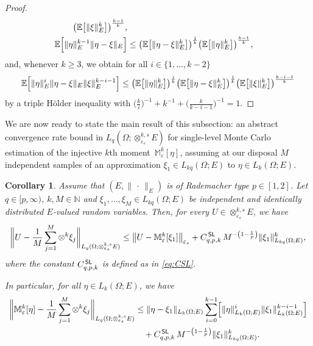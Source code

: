 \documentclass[reqno]{amsart}
\numberwithin{equation}{section}
\newcommand{\bbE}{\mathbb{E}}
\newcommand{\bbM}{\mathbb{M}}
\newcommand{\bbN}{\mathbb{N}}
\newcommand{\xk}{\otimes^k}
\newcommand{\xkseps}{\otimes^{k,s}_{\varepsilon_s}}
\newcommand{\tenvec}{U}
\newcommand{\Mk}{\bbM^k_\varepsilon}
\newcommand{\norm}[2]{     \| #1       \|_{ #2 }}
\newcommand{\eps}{\varepsilon}
\newcommand{\CSL}{C^{\,\sf SL}_{q,p,k}}
\newtheorem{corollary}[lemma]{Corollary}
\theoremstyle{remark}
\theoremstyle{definition}
\begin{document}
\begin{proof}
\begin{align*}
	\bigl( \bbE\bigl[ \norm{ \xi }{E}^k \bigr] \bigr)^{\frac{k-1}{k}}  , 
	\\ 
	\bbE\Bigl[ \norm{ \eta }{E}^{k-1} \norm{ \eta -\xi }{E} \Bigr] 
	&\leq 
	\bigl( \bbE\bigl[ \norm{ \eta -\xi }{E}^k \bigr] \bigr)^{\frac{1}{k}}  
	\bigl( \bbE\bigl[ \norm{ \eta }{E}^k \bigr] \bigr)^{\frac{k-1}{k}}  , 
	\end{align*} 
	and, whenever $k\geq 3$, 
	we obtain for all $i\in\{1,\ldots,k-2\}$ 
	\begin{align*} 
	\bbE\Bigl[ \norm{ \eta }{E}^i \norm{ \eta -\xi }{E} \norm{ \xi }{E}^{k-i-1} \Bigr] 
	\leq 		
	\bigl( \bbE\bigl[ \norm{ \eta }{E}^k \bigr] \bigr)^{\frac{i}{k}}  
	\bigl( \bbE\bigl[ \norm{ \eta -\xi }{E}^k \bigr] \bigr)^{\frac{1}{k}}  
	\bigl( \bbE\bigl[ \norm{ \xi }{E}^k \bigr] \bigr)^{\frac{k-i-1}{k}}  
	\end{align*} 
	by a triple H\"older inequality 
	with 
	$\bigl(\tfrac{k}{i}\bigr)^{-1} 
	+ 
	k^{-1}
	+ 
	\bigl(\tfrac{k}{k-i-1}\bigr)^{-1} 
	= 
	1$. 
\end{proof} 

We are now ready to state the main result of this subsection: 
an abstract convergence rate bound in $L_q(\Omega; \xkseps E)$ 
for single-level Monte Carlo 
estimation of the injective $k$th moment~$\Mk[\eta]$, 
assuming at our disposal $M$ independent  
samples of an approximation 
$\xi_1\in L_{kq}(\Omega;E)$ to $\eta\in L_k(\Omega;E)$. 

\begin{corollary}\label{cor:MC-k}
	Assume that  
	$(E,\norm{\,\cdot\,}{E})$ 
	is of Rademacher type $p\in[1,2]$. 
	Let $q\in[p,\infty)$, $k,M\in\bbN$ 
	and $\xi_1,\ldots,\xi_M\in L_{kq}(\Omega;E)$ be 
	independent and identically distributed 
	$E$-valued random variables. 
	Then, for every $\tenvec \in \xkseps E$, we have 
	\[
	\biggl\| 
	\tenvec 
	-
	\frac{1}{M} 
	\sum_{j=1}^M 
	\xk \xi_j 
	\biggr\|_{L_q(\Omega;\xkseps E)} 
	\leq 
	\bigl\| \tenvec - \Mk[\xi_1] \bigr\|_{\eps_s}
	+ 
	\CSL \,  
	M^{-\left( 1-\frac{1}{p} \right)} 
	\norm{ \xi_1 }{L_{kq}(\Omega; E)}^k 
	,
	\]
	where the constant $\CSL$ is defined as in \eqref{eq:CSL}. 
	
	In particular, 
	for all $\eta\in L_k(\Omega;E)$,
	we have   
	\begin{align*} 
	\biggl\| 
	\Mk[\eta]
	-
	\frac{1}{M} 
	\sum_{j=1}^M 
	\xk \xi_j 
	\biggr\|_{L_q(\Omega;\xkseps E)} 
	&\leq 
	\norm{ \eta - \xi_1 }{L_k(\Omega;E)} 
	\sum_{i=0}^{k-1} 
	\Bigl[ \norm{ \eta }{L_k(\Omega;E)}^i \norm{ \xi_1 }{L_k(\Omega;E)}^{k-i-1} \Bigr] 
	\\
	&\quad + 
	\CSL \,  
	M^{-\left( 1-\frac{1}{p} \right)} 
	\norm{ \xi_1 }{L_{kq}(\Omega; E)}^k 
	.
	\end{align*}
\end{corollary} 
\end{document}
